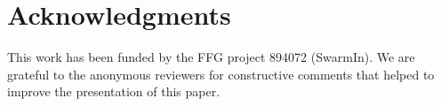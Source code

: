 \documentclass[runningheads]{llncs}
\begin{document}
\section*{Acknowledgments}

This work has been funded by the FFG project 894072 (SwarmIn).
We are grateful to the anonymous reviewers for constructive 
comments that helped to improve the presentation of this paper.




%
%
%
% 
% 
%

\end{document}

